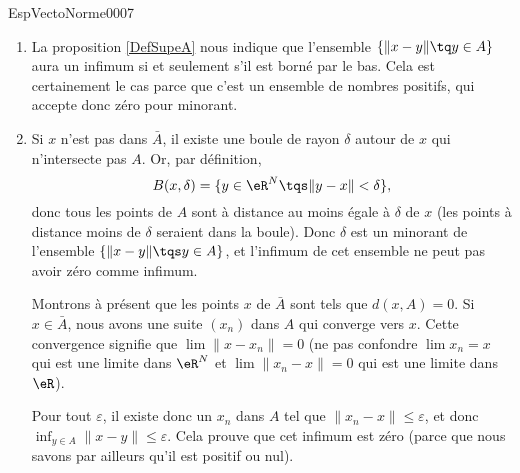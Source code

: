 \begin{corrige}{EspVectoNorme0007}

	\begin{enumerate}
		\item
			La proposition \ref{DefSupeA} nous indique que l'ensemble $\{ \| x-y \|\tq y\in A \}$ aura un infimum si et seulement s'il est borné par le bas. Cela est certainement le cas parce que c'est un ensemble de nombres positifs, qui accepte donc zéro pour minorant.

		\item
			Si $x$ n'est pas dans $\bar A$, il existe une boule de rayon $\delta$ autour de $x$ qui n'intersecte pas $A$. Or, par définition,
			\begin{equation}
				B(x,\delta)=\{ y\in\eR^N\tqs\| y-x \|<\delta \},
			\end{equation}
			donc tous les points de $A$ sont à distance au moins égale à $\delta$ de $x$ (les points à distance moins de $\delta$ seraient dans la boule). Donc $\delta$ est un minorant de l'ensemble $\{ \| x-y \|\tqs y\in A \}$, et l'infimum de cet ensemble ne peut pas avoir zéro comme infimum.

			Montrons à présent que les points $x$ de $\bar A$ sont tels que $d(x,A)=0$. Si $x\in\bar A$, nous avons une suite $(x_n)$ dans $A$ qui converge vers $x$. Cette convergence signifie que $\lim\| x-x_n \|=0$ (ne pas confondre $\lim x_n=x$ qui est une limite dans $\eR^N$ et $\lim\| x_n-x \|=0$ qui est une limite dans $\eR$).

			Pour tout $\varepsilon$, il existe donc un $x_n$ dans $A$ tel que $\| x_n-x \|\leq\varepsilon$, et donc $\inf_{y\in A}\| x-y \|\leq\varepsilon$. Cela prouve que cet infimum est zéro (parce que nous savons par ailleurs qu'il est positif ou nul).
			
	\end{enumerate}

\end{corrige}
